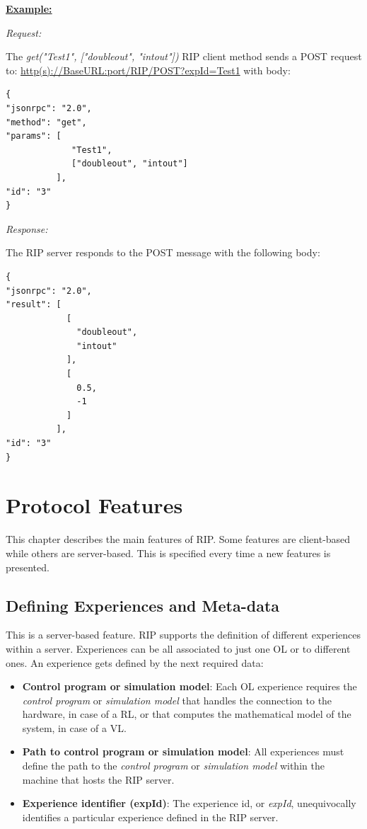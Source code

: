 \textbf{\underline{Example:}}

\textit{Request:}

The \textit{get("Test1", ["doubleout", "intout"])} RIP client method sends a POST request to: \url{http(s)://BaseURL:port/RIP/POST?expId=Test1} with body:

\begin{lstlisting}
{
"jsonrpc": "2.0",
"method": "get",
"params": [
  	         "Test1",
  	         ["doubleout", "intout"]
          ],
"id": "3"
}
\end{lstlisting}

\textit{Response:}

The RIP server responds to the POST message with the following body:

\begin{lstlisting}
{
"jsonrpc": "2.0",
"result": [
            [
              "doubleout",
              "intout"
            ],
            [
              0.5,
              -1
            ]
          ],
"id": "3"
}
\end{lstlisting}


\chapter{Protocol Features}
\label{System Features}

This chapter describes the main features of RIP. Some features are client-based while others are server-based. This is specified every time a new features is presented.

\section{Defining Experiences and Meta-data}
This is a server-based feature. RIP supports the definition of different experiences within a server. Experiences can be all associated to just one OL or to different ones. An experience gets defined by the next required data:

\begin{itemize}
    \item \textbf{Control program or simulation model}: Each OL experience requires the \textit{control program} or \textit{simulation model} that handles the connection to the hardware, in case of a RL, or that computes the mathematical model of the system, in case of a VL.
    \item \textbf{Path to control program or simulation model}: All experiences must define the path to the \textit{control program} or \textit{simulation model} within the machine that hosts the RIP server.
    \item \textbf{Experience identifier (expId)}: The experience id, or \textit{expId}, unequivocally identifies a particular experience defined in the RIP server.
\end{itemize}


